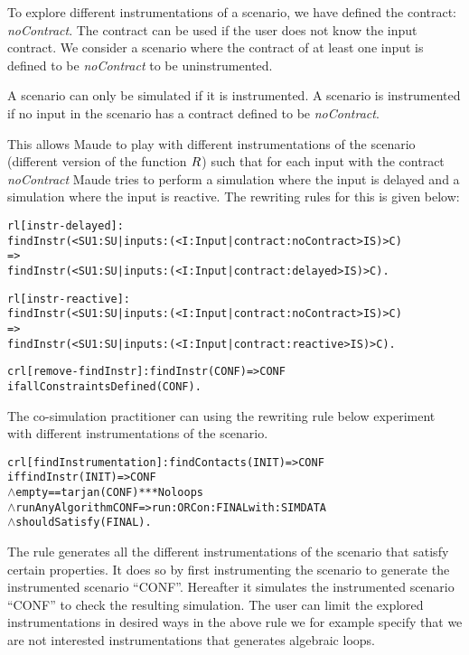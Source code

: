 To explore different instrumentations of a scenario, we have defined the contract: \textit{noContract}.
The contract can be used if the user does not know the input contract.
We consider a scenario where the contract of at least one input is defined to be \textit{noContract} to be uninstrumented.

A scenario can only be simulated if it is instrumented.
A scenario is instrumented if no input in the scenario has a contract defined to be \textit{noContract}.


This allows Maude to play with different instrumentations of the scenario (different version of the function $R$) such that for each input with the contract \textit{noContract} Maude tries to perform a simulation where the input is delayed and a simulation where the input is reactive.
The rewriting rules for this is given below:
\begin{alltt}
  \small
rl [instr-delayed]: 
findInstr(< SU1 : SU | inputs : (< I : Input | contract : noContract > IS) > C)
=>
findInstr(< SU1 : SU | inputs : (< I : Input | contract : delayed > IS) > C) .

rl [instr-reactive]: 
findInstr(< SU1 : SU | inputs : (< I : Input | contract : noContract > IS) > C)
=>
findInstr(< SU1 : SU | inputs : (< I : Input | contract : reactive > IS) > C) .

crl [remove-findInstr]: findInstr(CONF) => CONF 
  if allConstraintsDefined(CONF) .
\end{alltt}

The co-simulation practitioner can using the rewriting rule below experiment with different instrumentations of the scenario.

\begin{alltt}
  \small
  crl [findInstrumentation]: findContacts(INIT) => CONF
      if findInstr(INIT) => CONF
      \(\land\) empty == tarjan(CONF) *** No loops
      \(\land\) runAnyAlgorithm CONF => run: ORC on: FINAL with: SIMDATA
      \(\land\) shouldSatisfy(FINAL) .
  \end{alltt}

The rule generates all the different instrumentations of the scenario that satisfy certain properties.
It does so by first instrumenting the scenario to generate the instrumented scenario ``CONF''.
Hereafter it simulates the instrumented scenario ``CONF'' to check the resulting simulation.
The user can limit the explored instrumentations in desired ways in the above rule we for example specify that we are not interested instrumentations that generates algebraic loops.

